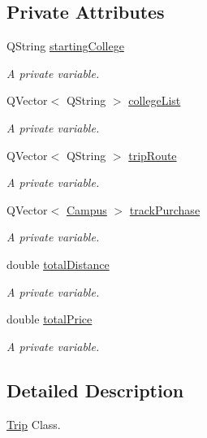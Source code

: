 \subsection*{Private Attributes}
\begin{DoxyCompactItemize}
\item 
Q\+String \hyperlink{class_trip_ac31031fb291112f7d4d8a7d6249d8436}{starting\+College}
\begin{DoxyCompactList}\small\item\em A private variable. \end{DoxyCompactList}\item 
Q\+Vector$<$ Q\+String $>$ \hyperlink{class_trip_a64029dbf999502ffe6517283a3e44214}{college\+List}
\begin{DoxyCompactList}\small\item\em A private variable. \end{DoxyCompactList}\item 
Q\+Vector$<$ Q\+String $>$ \hyperlink{class_trip_a86c5d46368390a7160c2c25064f638ae}{trip\+Route}
\begin{DoxyCompactList}\small\item\em A private variable. \end{DoxyCompactList}\item 
Q\+Vector$<$ \hyperlink{class_campus}{Campus} $>$ \hyperlink{class_trip_a1eada5f4eb916b135bd718292775f3b3}{track\+Purchase}
\begin{DoxyCompactList}\small\item\em A private variable. \end{DoxyCompactList}\item 
double \hyperlink{class_trip_a471bf8051193c1ffbba249171c154bda}{total\+Distance}
\begin{DoxyCompactList}\small\item\em A private variable. \end{DoxyCompactList}\item 
double \hyperlink{class_trip_a33db8f1dd1ea80305ac587dcf56bf563}{total\+Price}
\begin{DoxyCompactList}\small\item\em A private variable. \end{DoxyCompactList}\end{DoxyCompactItemize}


\subsection{Detailed Description}
\hyperlink{class_trip}{Trip} Class. 

